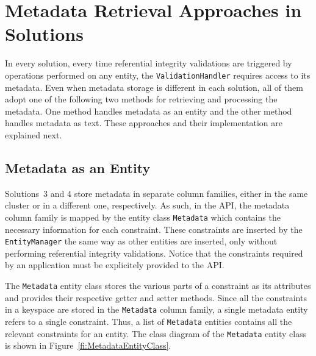 \section{Metadata Retrieval Approaches in Solutions}
\label{s:implementation-MDinSolutions}

In every solution,  every time referential integrity validations are triggered
by operations  performed  on  any entity,  the
\texttt{ValidationHandler} requires access to its  metadata. Even when metadata
storage is different in each solution, all of them adopt  
 one of the following two methods for retrieving and processing the
metadata. One method handles metadata as an entity and the other method handles
metadata as text. These approaches and their implementation 
are explained next.


% 

 
\subsection{Metadata as an Entity} \label{ss:implementation-MDEntityClass}
Solutions~3 and 4 store  metadata in separate column families, either in the
same cluster or in a different one, respectively.  As such, in the \ac{API}, the
metadata column family is mapped by the entity class \texttt{Metadata} which contains the
necessary information for each constraint.  These constraints are inserted 
by the \texttt{EntityManager} the same way as other entities are inserted, only
without performing referential integrity validations. Notice that the
constraints required by an application must be explicitely provided to the
\ac{API}.

 
The \texttt{Metadata} entity class stores the various parts of a constraint as
its attributes and provides their respective getter and setter methods.  Since
all the constraints in a keyspace are stored in the \texttt{Metadata} column
family, a single metadata entity refers to a single constraint. Thus, a list
of \texttt{Metadata} entities contains  all the relevant constraints for an
entity. The class diagram of the \texttt{Metadata} entity class is shown in
Figure~\ref{fi:MetadataEntityClass}.

